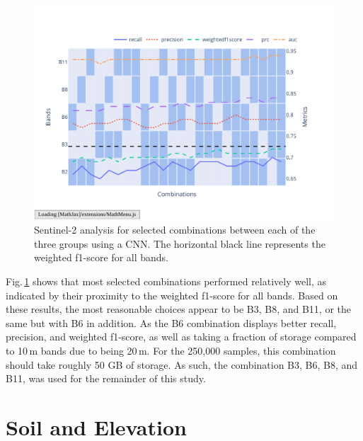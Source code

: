 \begin{figure}[ht]
    \centering
    \includegraphics[width=0.9\linewidth, trim={20pt 40pt 10pt 30pt}, clip]{figures/figures_analysis/band_selection_further.pdf}
    \caption{Sentinel-2 analysis for selected combinations between each of the three groups using a CNN. The horizontal black line represents the weighted f1-score for all bands.}
    \label{fig:band_selection_further}
\end{figure}

Fig.\,\ref{fig:band_selection_further} shows that most selected combinations performed relatively well, as indicated by their proximity to the weighted f1-score for all bands. Based on these results, the most reasonable choices appear to be B3, B8, and B11, or the same but with B6 in addition. As the B6 combination displays better recall, precision, and weighted f1-score, as well as taking a fraction of storage compared to 10\,m bands due to being 20\,m. For the 250,000 samples, this combination should take roughly 50 GB of storage. As such, the combination B3, B6, B8, and B11, was used for the remainder of this study.

\section{Soil and Elevation}

